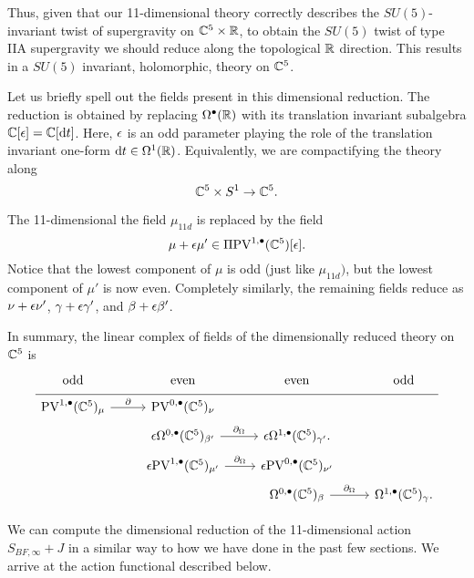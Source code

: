 
Thus, given that our 11-dimensional theory correctly describes the $SU(5)$-invariant twist of supergravity on $\mathbb C^5 \times \mathbb R$, to obtain the $SU(5)$ twist of type IIA supergravity we should reduce along the topological $\mathbb R$ direction. 
This results in a $SU(5)$ invariant, holomorphic, theory on $\mathbb C^5$. 

Let us briefly spell out the fields present in this dimensional reduction. 
The reduction is obtained by replacing $\Omega^\bullet(\mathbb R)$ with its translation invariant subalgebra $\mathbb C[\epsilon] = \mathbb C[{\rm d} t]$. 
Here, $\epsilon$ is an odd parameter playing the role of the translation invariant one-form ${\rm d} t \in \Omega^1(\mathbb R)$. 
Equivalently, we are compactifying the theory along 
\[
\mathbb C^5 \times S^1 \to \mathbb C^5 .
\]

The 11-dimensional the field $\mu_{11d}$ is replaced by the field 
\[
\mu + \epsilon \mu' \in \Pi {\rm PV}^{1,\bullet}(\mathbb C^5) [\epsilon] .
\]
Notice that the lowest component of $\mu$ is odd (just like $\mu_{11d})$, but the lowest component of $\mu'$ is now even. 
Completely similarly, the remaining fields reduce as $\nu + \epsilon \nu'$, $\gamma + \epsilon \gamma'$, and $\beta + \epsilon \beta'$. 

In summary, the linear complex of fields of the dimensionally reduced theory on $\mathbb C^5$ is
\begin{equation}
  \label{eqn:IIAsu5} 
  \begin{tikzcd}[row sep = 1 ex]
    {\rm odd} & {\rm even} & {\rm even} & {\rm odd} \\ \hline
    \PV^{1,\bu}(\CC^5)_{\mu} \ar[r, "\del"] & \PV^{0,\bu}(\CC^5)_\nu & \\ 
     & \ep\Omega^{0,\bu}(\CC^5)_{\beta'} \ar[r, "\div"] & \ep\Omega^{1,\bu}(\CC^5)_{\gamma'} . \\
     &  \ep \PV^{1,\bu}(\CC^5)_{\mu'} \ar[r, "\div"] & \ep \PV^{0,\bu}(\CC^5)_{\nu'} \\
     & & \Omega^{0,\bu}(\CC^5)_\beta \ar[r, "\div"] & \Omega^{1,\bu}(\CC^5)_\gamma.
\end{tikzcd}
\end{equation}

We can compute the dimensional reduction of the 11-dimensional action $S_{BF,\infty} + J$ in a similar way to how we have done in the past few sections. 
We arrive at the action functional described below. 

